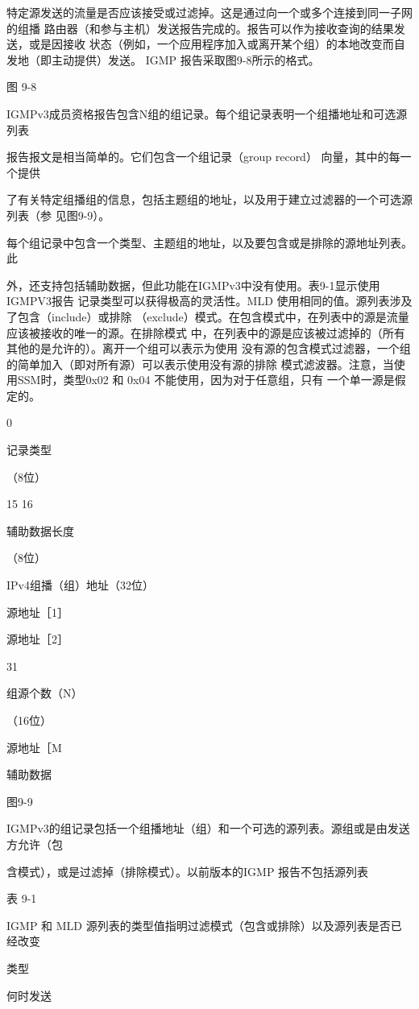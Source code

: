 特定源发送的流量是否应该接受或过滤掉。这是通过向一个或多个连接到同一子网的组播
路由器（和参与主机）发送报告完成的。报告可以作为接收查询的结果发送，或是因接收
状态（例如，一个应用程序加入或离开某个组）的本地改变而自发地（即主动提供）发送。
IGMP 报告采取图9-8所示的格式。

图 9-8

IGMPv3成员资格报告包含N组的组记录。每个组记录表明一个组播地址和可选源列表

报告报文是相当简单的。它们包含一个组记录（group record） 向量，其中的每一个提供

了有关特定组播组的信息，包括主题组的地址，以及用于建立过滤器的一个可选源列表（参
见图9-9）。

每个组记录中包含一个类型、主题组的地址，以及要包含或是排除的源地址列表。此

外，还支持包括辅助数据，但此功能在IGMPv3中没有使用。表9-1显示使用IGMPV3报告
记录类型可以获得极高的灵活性。MLD 使用相同的值。源列表涉及了包含（include）或排除
（exclude）模式。在包含模式中，在列表中的源是流量应该被接收的唯一的源。在排除模式
中，在列表中的源是应该被过滤掉的（所有其他的是允许的）。离开一个组可以表示为使用
没有源的包含模式过滤器，一个组的简单加入（即对所有源）可以表示使用没有源的排除
模式滤波器。注意，当使用SSM时，类型0x02 和 0x04 不能使用，因为对于任意组，只有
一个单一源是假定的。

0

记录类型

（8位）

15 16

辅助数据长度

（8位）

IPv4组播（组）地址（32位）

源地址［1］

源地址［2］

31

组源个数（N）

（16位）

源地址［M

辅助数据

图9-9

IGMPv3的组记录包括一个组播地址（组）和一个可选的源列表。源组或是由发送方允许（包

含模式），或是过滤掉（排除模式）。以前版本的IGMP 报告不包括源列表

表 9-1

IGMP 和 MLD 源列表的类型值指明过滤模式（包含或排除）以及源列表是否已经改变

类型

何时发送

